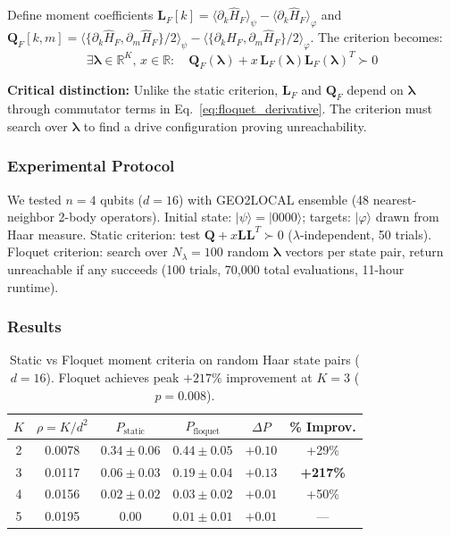 Define moment coefficients $\mathbf{L}_F[k] = \langle \partial_k \hat{H}_F \rangle_\psi - \langle \partial_k \hat{H}_F \rangle_\varphi$ and $\mathbf{Q}_F[k,m] = \langle \{\partial_k \hat{H}_F, \partial_m \hat{H}_F\}/2 \rangle_\psi - \langle \{\partial_k \hat{H}_F, \partial_m \hat{H}_F\}/2 \rangle_\varphi$. The criterion becomes:
\begin{equation}
\boxed{
\exists \boldsymbol{\lambda} \in \mathbb{R}^K, \, x \in \mathbb{R} : \quad \mathbf{Q}_F(\boldsymbol{\lambda}) + x \, \mathbf{L}_F(\boldsymbol{\lambda}) \mathbf{L}_F(\boldsymbol{\lambda})^T \succ 0
}
\label{eq:floquet_criterion}
\end{equation}

\textbf{Critical distinction:} Unlike the static criterion, $\mathbf{L}_F$ and $\mathbf{Q}_F$ depend on $\boldsymbol{\lambda}$ through commutator terms in Eq.~\eqref{eq:floquet_derivative}. The criterion must search over $\boldsymbol{\lambda}$ to find a drive configuration proving unreachability.

\subsubsection{Experimental Protocol}

We tested $n=4$ qubits ($d=16$) with GEO2LOCAL ensemble (48 nearest-neighbor 2-body operators). Initial state: $|\psi\rangle = |0000\rangle$; targets: $|\varphi\rangle$ drawn from Haar measure. Static criterion: test $\mathbf{Q} + x \mathbf{L}\mathbf{L}^T \succ 0$ ($\lambda$-independent, 50 trials). Floquet criterion: search over $N_\lambda = 100$ random $\boldsymbol{\lambda}$ vectors per state pair, return unreachable if any succeeds (100 trials, 70,000 total evaluations, 11-hour runtime).

\subsubsection{Results}

\begin{table}[htbp]
\centering
\caption{Static vs Floquet moment criteria on random Haar state pairs ($d=16$). Floquet achieves peak $+217\%$ improvement at $K=3$ ($p=0.008$).}
\label{tab:floquet_static}
\begin{tabular}{cccccc}
\hline
$K$ & $\rho = K/d^2$ & $P_{\text{static}}$ & $P_{\text{floquet}}$ & $\Delta P$ & \% Improv. \\
\hline
2 & 0.0078 & $0.34 \pm 0.06$ & $0.44 \pm 0.05$ & $+0.10$ & +29\% \\
3 & 0.0117 & $0.06 \pm 0.03$ & $0.19 \pm 0.04$ & $+0.13$ & \textbf{+217\%} \\
4 & 0.0156 & $0.02 \pm 0.02$ & $0.03 \pm 0.02$ & $+0.01$ & +50\% \\
5 & 0.0195 & $0.00$ & $0.01 \pm 0.01$ & $+0.01$ & — \\
\hline
\end{tabular}
\end{table}

